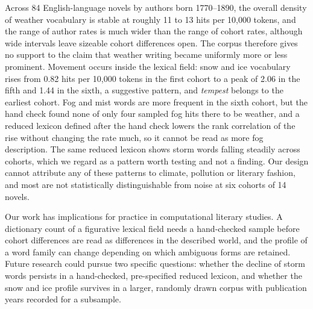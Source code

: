 \documentclass[11pt]{article}
\begin{document}
Across 84 English-language novels by authors born 1770--1890, the overall density of weather vocabulary is stable at roughly 11 to 13 hits per 10,000 tokens, and the range of author rates is much wider than the range of cohort rates, although wide intervals leave sizeable cohort differences open. The corpus therefore gives no support to the claim that weather writing became uniformly more or less prominent. Movement occurs inside the lexical field: snow and ice vocabulary rises from 0.82 hits per 10,000 tokens in the first cohort to a peak of 2.06 in the fifth and 1.44 in the sixth, a suggestive pattern, and \emph{tempest} belongs to the earliest cohort. Fog and mist words are more frequent in the sixth cohort, but the hand check found none of only four sampled fog hits there to be weather, and a reduced lexicon defined after the hand check lowers the rank correlation of the rise without changing the rate much, so it cannot be read as more fog description. The same reduced lexicon shows storm words falling steadily across cohorts, which we regard as a pattern worth testing and not a finding. Our design cannot attribute any of these patterns to climate, pollution or literary fashion, and most are not statistically distinguishable from noise at six cohorts of 14 novels.

Our work has implications for practice in computational literary studies. A dictionary count of a figurative lexical field needs a hand-checked sample before cohort differences are read as differences in the described world, and the profile of a word family can change depending on which ambiguous forms are retained. Future research could pursue two specific questions: whether the decline of storm words persists in a hand-checked, pre-specified reduced lexicon, and whether the snow and ice profile survives in a larger, randomly drawn corpus with publication years recorded for a subsample.



\end{document}
